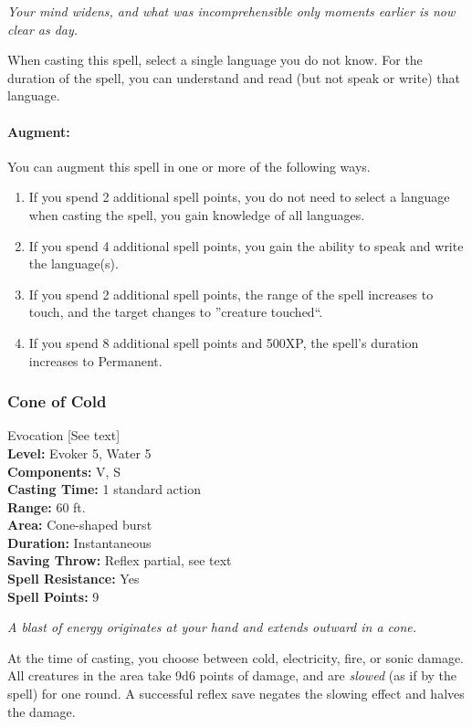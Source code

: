 \emph{Your mind widens, and what was incomprehensible only moments earlier is now clear as day.}

When casting this spell, select a single language you do not know. For the duration of the spell, you can understand and read (but not speak or write) that language.


\paragraph{Augment:} You can augment this spell in one or more of the following ways.
\begin{enumerate}
 \item If you spend 2 additional spell points, you do not need to select a language when casting the spell, you gain knowledge of all languages.
 \item If you spend 4 additional spell points, you gain the ability to speak and write the language(s).
 \item If you spend 2 additional spell points, the range of the spell increases to touch, and the target changes to ''creature touched``.
 \item If you spend 8 additional spell points and 500XP, the spell's duration increases to Permanent.
\end{enumerate}
\subsubsection{Cone of Cold} 
\label{Spell:ConeOfCold}
Evocation [See text]
\\ \textbf{Level:} Evoker 5, Water 5
\\ \textbf{Components:} V, S
\\ \textbf{Casting Time:} 1 standard action
\\ \textbf{Range:} 60 ft.
\\ \textbf{Area:} Cone-shaped burst
\\ \textbf{Duration:} Instantaneous
\\ \textbf{Saving Throw:} Reflex partial, see text
\\ \textbf{Spell Resistance:} Yes
\\ \textbf{Spell Points:} 9

\emph{A blast of energy originates at your hand and extends outward in a cone.}

At the time of casting, you choose between cold, electricity, fire, or sonic damage.
All creatures in the area take 9d6 points of damage, and are \emph{slowed} (as if by the  spell) for one round.
A successful reflex save negates the slowing effect and halves the damage.

